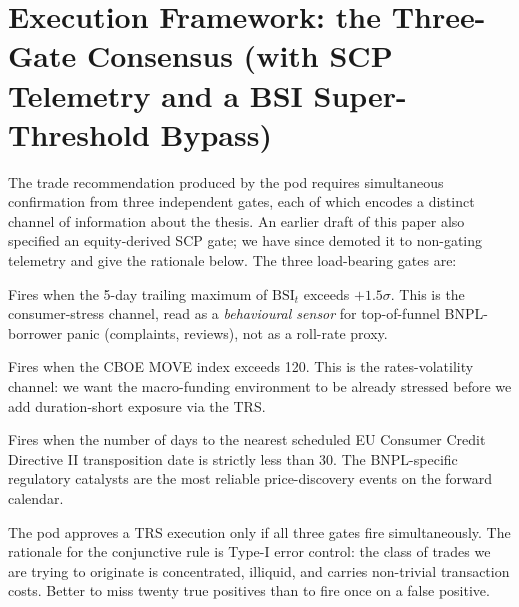 \documentclass[11pt,letterpaper]{article}
\newcommand{\bsi}{\text{BSI}}
\begin{document}
\section{Execution Framework: the Three-Gate Consensus (with SCP
Telemetry and a BSI Super-Threshold Bypass)}
\label{sec:exec}

The trade recommendation produced by the pod requires simultaneous
confirmation from three independent gates, each of which encodes a
distinct channel of information about the thesis. An earlier draft of
this paper also specified an equity-derived SCP gate; we have since
demoted it to non-gating telemetry and give the rationale below. The
three load-bearing gates are:

\begin{description}[leftmargin=2em,style=nextline]
\item[Gate~1 --- BSI momentum.] Fires when the 5-day trailing
maximum of $\bsi_t$ exceeds $+1.5\sigma$. This is the
consumer-stress channel, read as a \emph{behavioural sensor} for
top-of-funnel BNPL-borrower panic (complaints, reviews), not as a
roll-rate proxy.
\item[Gate~2 --- MOVE level.] Fires when the CBOE MOVE index exceeds
120. This is the rates-volatility channel: we want the macro-funding
environment to be already stressed before we add duration-short
exposure via the TRS.
\item[Gate~3 --- CCD~II catalyst proximity.] Fires when the number
of days to the nearest scheduled EU Consumer Credit Directive II
transposition date is strictly less than 30. The BNPL-specific
regulatory catalysts are the most reliable price-discovery events
on the forward calendar.
\end{description}

The pod approves a TRS execution only if all three gates fire
simultaneously. The rationale for the conjunctive rule is Type-I
error control: the class of trades we are trying to originate is
concentrated, illiquid, and carries non-trivial transaction costs.
Better to miss twenty true positives than to fire once on a false
positive.
\end{document}

